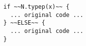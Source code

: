 \begin{lstlisting}[style=reclojureScala]
if ~~N.typep(x)~~ {
  ... original code ...
} ~~ELSE~~ {
  ... original code ...
}
\end{lstlisting}
